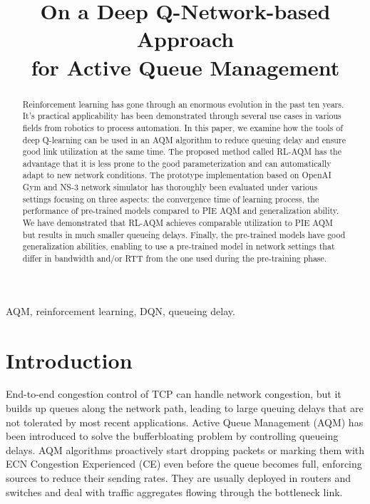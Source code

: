 \documentclass[conference]{IEEEtran}
\begin{document}
\title{On a Deep Q-Network-based Approach \\
for Active Queue Management}

\author{
}

\maketitle

\begin{abstract}
Reinforcement learning has gone through an enormous evolution in the past ten years. It's practical applicability has been demonstrated through several use cases in various fields from robotics to process automation. In this paper, we examine how the tools of deep Q-learning can be used in an AQM algorithm to reduce queuing delay and ensure good link utilization at the same time. The proposed method called RL-AQM has the advantage that it is less prone to the good parameterization and can automatically adapt to new network conditions. The prototype implementation based on OpenAI Gym and NS-3 network simulator has thoroughly been evaluated under various settings focusing on three aspects: the convergence time of learning process, the performance of pre-trained models compared to PIE AQM and generalization ability. We have demonstrated that RL-AQM achieves comparable utilization to PIE AQM but results in much smaller queueing delays. Finally, the pre-trained models have good generalization abilities, enabling to use a pre-trained model in network settings that differ in bandwidth and/or RTT from the one used during the pre-training phase.
\end{abstract}

\begin{IEEEkeywords}
AQM, reinforcement learning, DQN, queueing delay.
\end{IEEEkeywords}

\section{Introduction}
End-to-end congestion control of TCP can handle network congestion, but it builds up queues along the network path, leading to large queuing delays that are not tolerated by most recent applications. Active Queue Management (AQM) has been introduced to solve the bufferbloating problem by controlling queueing delays.  
AQM algorithms proactively start dropping packets or marking them with ECN Congestion Experienced (CE)  even before the queue becomes full, enforcing sources to reduce their sending rates. They are usually deployed in routers and switches and deal with traffic aggregates flowing through the bottleneck link.
\end{document}
